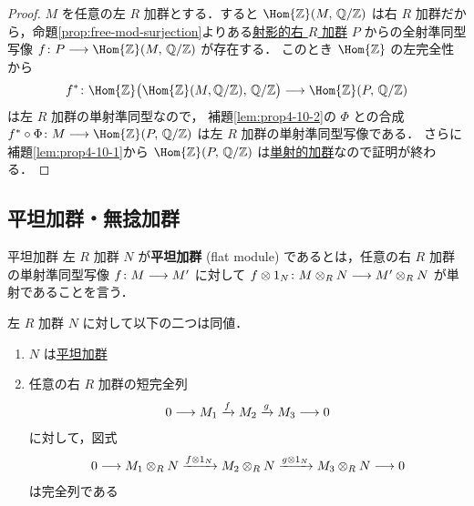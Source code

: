 \documentclass[algtopo_main]{subfiles}
\begin{document}
\begin{proof}
    \hrulefill

    $M$ を任意の左 $R$ 加群とする．すると $\Hom{\mathbb{Z}}(M,\, \mathbb{Q}/\mathbb{Z})$ は右 $R$ 加群だから，命題\ref{prop:free-mod-surjection}よりある\hyperref[def:proj-mod]{射影的右 $R$ 加群} $P$ からの全射準同型写像 $f \colon P \lto \Hom{\mathbb{Z}}(M,\, \mathbb{Q}/\mathbb{Z})$ が存在する．
    このとき $\Hom{\mathbb{Z}}$ の左完全性から 
    \begin{align}
        f^* \colon \Hom{\mathbb{Z}} \bigl( \Hom{\mathbb{Z}}(M, \mathbb{Q}/\mathbb{Z}),\, \mathbb{Q}/\mathbb{Z} \bigr) \lto \Hom{\mathbb{Z}} (P,\, \mathbb{Q}/\mathbb{Z})
    \end{align}
    は左 $R$ 加群の単射準同型なので，
    補題\ref{lem:prop4-10-2}の $\Phi$ との合成 $f^* \circ \Phi \colon M \lto \Hom{\mathbb{Z}}(P,\, \mathbb{Q}/\mathbb{Z})$ は左 $R$ 加群の単射準同型写像である．
    さらに補題\ref{lem:prop4-10-1}から $\Hom{\mathbb{Z}}(P,\, \mathbb{Q}/\mathbb{Z})$ は\hyperref[def:inj-mod]{単射的加群}なので証明が終わる．
\end{proof}


\subsection{平坦加群・無捻加群}

\begin{mydef}[label=def:flat-mod]{平坦加群}
    左 $R$ 加群 $N$ が\textbf{平坦加群} (flat module) であるとは，任意の右 $R$ 加群の単射準同型写像 $f\colon M \longrightarrow M'$ に対して $f \otimes 1_N \colon M \otimes_R N \longrightarrow M' \otimes_R N$ が単射であることを言う．
\end{mydef}

\begin{mylem}[label=lem:flat-mod-basic]{}
    左 $R$ 加群 $N$ に対して以下の二つは同値．
    \begin{enumerate}
        \item $N$ は\hyperref[def:flat-mod]{平坦加群}
        \item 任意の右 $R$ 加群の短完全列
        \begin{align}
            0 \longrightarrow M_1 \xrightarrow{f} M_2 \xrightarrow{g} M_3 \longrightarrow 0
        \end{align}
        に対して，図式
        \begin{align}
            0 \longrightarrow M_1 \otimes_R N \xrightarrow{f \otimes 1_N} M_2\otimes_R N \xrightarrow{g \otimes 1_N} M_3 \otimes_R N\longrightarrow 0
        \end{align}
        は完全列である
    \end{enumerate}
\end{mylem}
\end{document}
